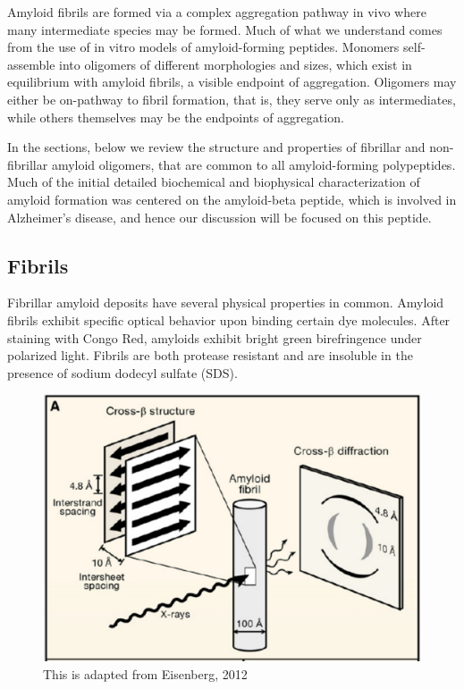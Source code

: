 Amyloid fibrils are formed via a complex aggregation pathway in vivo where many intermediate species may be formed.  Much of what we understand comes from the use of in vitro models of amyloid-forming peptides. Monomers self-assemble into oligomers of different morphologies and sizes, which exist in equilibrium with amyloid fibrils, a visible endpoint of aggregation. Oligomers may either be on-pathway to fibril formation, that is, they serve only as intermediates, while others themselves may be the endpoints of aggregation.

In the sections, below we review the structure and properties of fibrillar and non-fibrillar amyloid oligomers, that are common to all amyloid-forming polypeptides.  Much of the initial detailed biochemical and biophysical characterization of amyloid formation was centered on the amyloid-beta peptide, which is involved in Alzheimer's disease, and hence our discussion will be focused on this peptide. %

\subsection{Fibrils}

Fibrillar amyloid deposits have several physical properties in common. Amyloid fibrils exhibit specific optical behavior upon binding certain dye molecules. After staining with Congo Red, amyloids exhibit bright green birefringence under polarized light. Fibrils are both protease resistant and are insoluble in the presence of sodium dodecyl sulfate (SDS).  

\begin{figure}
  \centering
  \includegraphics[width=6in]{figures/introduction/fibril_structure_diffraction.pdf}
  \caption[Characteristic cross-$\beta$ spacings from X-ray fibre diffraction studies of amyloid fibrils]{This is adapted from Eisenberg, 2012}
  \label{fig:fibril_diffraction}
\end{figure}

